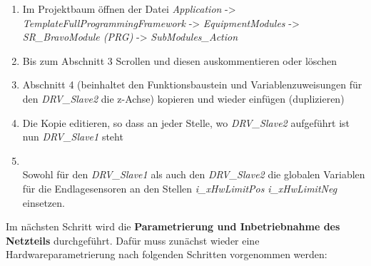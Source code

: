 \documentclass[../../../Bachelorarbeit.tex]{subfiles}
\begin{document}
\begin{enumerate}
    \item Im Projektbaum öffnen der Datei \textit{Application} -> \textit{TemplateFullProgrammingFramework} -> \textit{EquipmentModules} -> \textit{SR\_BravoModule (PRG)} -> \textit{SubModules\_Action}
    \item Bis zum Abschnitt 3 Scrollen und diesen auskommentieren oder löschen
    \item Abschnitt 4 (beinhaltet den Funktionsbaustein und Variablenzuweisungen für den \textit{DRV\_Slave2} \bzw die z-Achse) kopieren und wieder einfügen (duplizieren)
    \item Die Kopie editieren, so dass an jeder Stelle, wo \textit{DRV\_Slave2} aufgeführt ist nun \textit{DRV\_Slave1} steht
    \item \begin{minipage}[t]{\linewidth}
        \raggedright
        \label{fig:my-img36}
    \end{minipage}
    \bigskip \\
    Sowohl für den \textit{DRV\_Slave1} als auch den \textit{DRV\_Slave2} die globalen Variablen für die Endlagesensoren an den Stellen \textit{i\_xHwLimitPos} \bzw \textit{i\_xHwLimitNeg} einsetzen.
\end{enumerate}

Im nächsten Schritt wird die \textbf{Parametrierung und Inbetriebnahme des Netzteils} durchgeführt. Dafür muss zunächst wieder eine Hardwareparametrierung nach folgenden Schritten vorgenommen werden:
\end{document}
